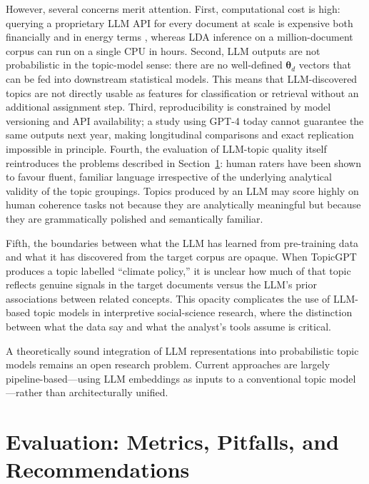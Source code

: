 \documentclass[11pt,a4paper]{article}
\newcommand{\vect}[1]{\boldsymbol{#1}}
\begin{document}
However, several concerns merit attention.
First, computational cost is high: querying a proprietary LLM API for
every document at scale is expensive both financially and in energy
terms \parencite{strubell2019energy}, whereas LDA inference on a
million-document corpus can run on a single CPU in hours.
Second, LLM outputs are not probabilistic in the topic-model sense:
there are no well-defined $\vect{\theta}_{d}$ vectors that can be
fed into downstream statistical models.
This means that LLM-discovered topics are not directly usable as
features for classification or retrieval without an additional
assignment step.
Third, reproducibility is constrained by model versioning and API
availability; a study using GPT-4 today cannot guarantee the same
outputs next year, making longitudinal comparisons and exact
replication impossible in principle.
Fourth, the evaluation of LLM-topic quality itself reintroduces the
problems described in Section~\ref{sec:evaluation}: human raters
have been shown to favour fluent, familiar language irrespective of
the underlying analytical validity of the topic groupings.
Topics produced by an LLM may score highly on human coherence tasks
not because they are analytically meaningful but because they are
grammatically polished and semantically familiar.

Fifth, the boundaries between what the LLM has learned from
pre-training data and what it has discovered from the target corpus
are opaque.
When TopicGPT produces a topic labelled ``climate policy,'' it is
unclear how much of that topic reflects genuine signals in the target
documents versus the LLM's prior associations between related
concepts.
This opacity complicates the use of LLM-based topic models in
interpretive social-science research, where the distinction between
what the data say and what the analyst's tools assume is critical.

A theoretically sound integration of LLM representations into
probabilistic topic models remains an open research problem.
Current approaches are largely pipeline-based---using LLM embeddings
as inputs to a conventional topic model---rather than architecturally
unified.

\section{Evaluation: Metrics, Pitfalls, and Recommendations}
\label{sec:evaluation}
\end{document}
